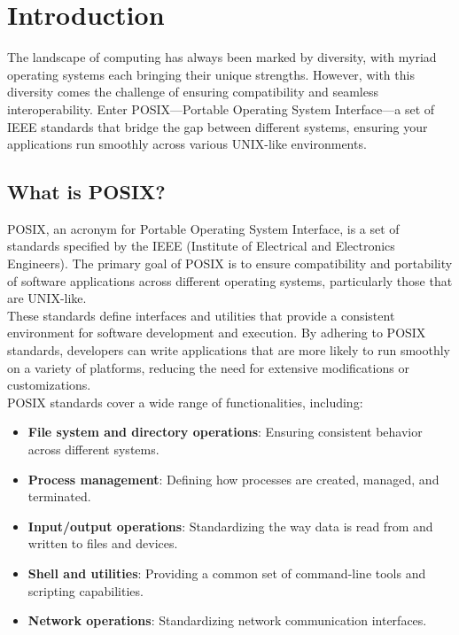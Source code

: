 \section{Introduction}

The landscape of computing has always been marked by diversity, with myriad operating systems each bringing their unique strengths. However, with this diversity comes the challenge of ensuring compatibility and seamless interoperability. Enter POSIX—Portable Operating System Interface—a set of IEEE standards that bridge the gap between different systems, ensuring your applications run smoothly across various UNIX-like environments.
\\
\subsection{What is POSIX?}

POSIX, an acronym for Portable Operating System Interface, is a set of standards specified by the IEEE (Institute of Electrical and Electronics Engineers). The primary goal of POSIX is to ensure compatibility and portability of software applications across different operating systems, particularly those that are UNIX-like.
\\
These standards define interfaces and utilities that provide a consistent environment for software development and execution. By adhering to POSIX standards, developers can write applications that are more likely to run smoothly on a variety of platforms, reducing the need for extensive modifications or customizations.
\\
POSIX standards cover a wide range of functionalities, including: 
\begin{itemize} \item \textbf{File system and directory operations}: Ensuring consistent behavior across different systems. 
    \item \textbf{Process management}: Defining how processes are created, managed, and terminated. 
    \item \textbf{Input/output operations}: Standardizing the way data is read from and written to files and devices. 
    \item \textbf{Shell and utilities}: Providing a common set of command-line tools and scripting capabilities. 
    \item \textbf{Network operations}: Standardizing network communication interfaces. 
\end{itemize}

